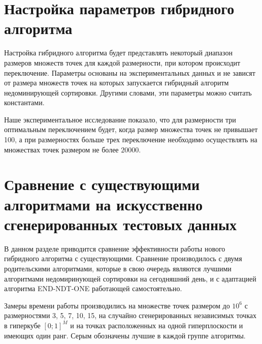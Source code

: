 \section{Настройка параметров гибридного алгоритма}

Настройка гибридного алгоритма будет представлять некоторый диапазон размеров множеств точек для каждой размерности, при котором происходит переключение. Параметры основаны на экспериментальных данных и не зависят от размера множеств точек на которых запускается гибридный алгоритм недоминирующей сортировки. Другими словами, эти параметры можно считать константами. 

Наше экспериментальное исследование показало, что для размерности три оптимальным переключением будет, когда размер множества точек не привышает 100, а при размерностях больше трех переключение необходимо осуществлять на множествах точек размером не более $20 000$. 

\section{Сравнение с существующими алгоритмами на искусственно сгенерированных тестовых данных}

В данном разделе приводится сравнение эффективности работы нового гибридного алгоритма с существующими. Сравнение производилось с двумя родительскими алгоритмами, которые в свою очередь являются лучшими алгоритмами недомиринующей сортировки на сегодняшний день, и с адаптацией алгоритма END-NDT-ONE работающей самостоятельно.

Замеры времени работы производились на множестве точек размером до $10^6$ с размерностями 3, 5, 7, 10, 15, на случайно сгенерированных независимых точках в гиперкубе $[0; 1]^M$ и на точках расположенных на одной гиперплоскости и имеющих один ранг. Серым обозначены лучшие в каждой группе алгоритмы.

\newcommand{\best}{\cellcolor{gray!50!white}}

